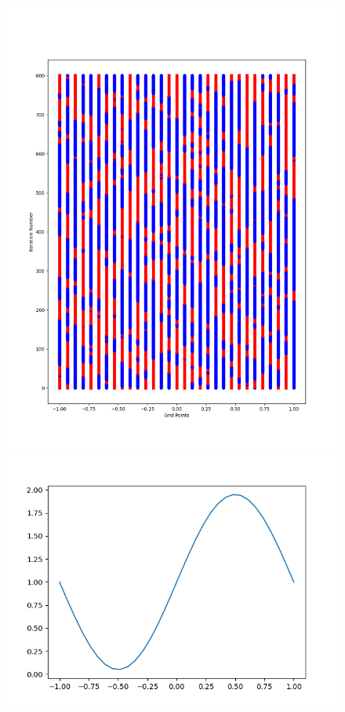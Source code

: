 \begin{figure}[h]
  \centering
  \includegraphics[scale=0.4]{figures/grid-opt/poisson_sine_grid_time.png}\\
  \includegraphics[scale=0.3]{figures/grid-opt/poisson_sine_coeffs.png}

\end{figure}
